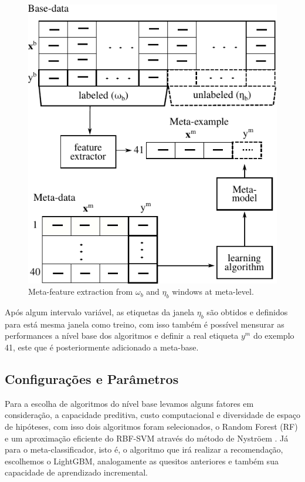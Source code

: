 \documentclass[conference,compsoc]{IEEEtran}
\begin{document}
\begin{figure}[ht]
    \centering
    \includegraphics[width=\linewidth]{imgs/metastream_diag1.pdf}
    \caption{Meta-feature extraction from $\omega_b$ and $\eta_b$ windows at meta-level.}
    \label{fig:ms_diagram1}
\end{figure}

Após algum intervalo variável, as etiquetas da janela $\eta_b$ são obtidos e definidos para está mesma janela como treino, com isso também é possível mensurar as performances a nível base dos algoritmos e definir a real etiqueta $y^m$ do exemplo 41, este que é posteriormente adicionado a meta-base.

\subsection{Configurações e Parâmetros}
\label{configs}
Para a escolha de algoritmos do nível base levamos alguns fatores em consideração, a capacidade preditiva, custo computacional e diversidade de espaço de hipóteses, com isso dois algoritmos foram selecionados, o Random Forest (RF) \cite{breiman2001random} e um aproximação eficiente do RBF-SVM através do método de Nystr\"oem \cite{williams2001using}. Já para o meta-classificador, isto é, o algoritmo que irá realizar a recomendação, escolhemos o LightGBM, analogamente as quesitos anteriores e também sua capacidade de aprendizado incremental.
\end{document}
